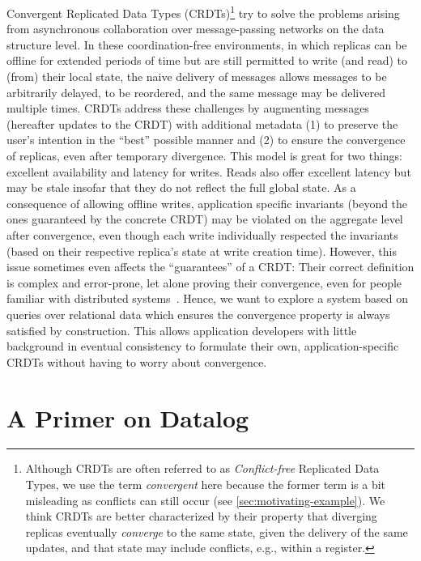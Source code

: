 \documentclass{article}
\begin{document}
Convergent Replicated Data Types (CRDTs)\footnote{
	Although CRDTs are often referred to as \emph{Conflict-free} Replicated
	Data Types, we use the term \emph{convergent} here because the former term
	is a bit misleading as conflicts can still occur
	(see \autoref{sec:motivating-example}).
	We think CRDTs are better characterized by their property that diverging
	replicas eventually \emph{converge} to the same state,
	given the delivery of the same updates,
	and that state may include conflicts, e.g., within a register.
} try to solve the problems arising from asynchronous collaboration over
message-passing networks on the data structure level.
In these coordination-free environments, in which replicas can be offline
for extended periods of time but are still permitted to write (and read)
to (from) their local state,
the naive delivery of messages allows messages to be arbitrarily delayed,
to be reordered, and the same message may be delivered multiple times.
CRDTs address these challenges by augmenting messages (hereafter updates
to the CRDT) with additional metadata (1) to preserve the user's intention
in the ``best'' possible manner and (2) to ensure the convergence of replicas,
even after temporary divergence.
This model is great for two things: excellent availability and latency for writes.
Reads also offer excellent latency but may be stale insofar that they do not
reflect the full global state.
As a consequence of allowing offline writes,
application specific invariants (beyond the ones guaranteed by the concrete CRDT)
may be violated on the aggregate level after convergence,
even though each write individually respected the invariants (based on their
respective replica's state at write creation time).
However, this issue sometimes even affects the ``guarantees'' of a CRDT:
Their correct definition is complex and error-prone,
let alone proving their convergence, even for people familiar with distributed
systems~\cite{kleppmann2022assessing, gomes2017verifying}.
Hence, we want to explore a system based on queries over relational data
which ensures the convergence property is always satisfied by construction.
This allows application developers with little background in eventual
consistency to formulate their own, application-specific CRDTs without
having to worry about convergence.

\section{A Primer on Datalog}
\label{sec:datalog-primer}
\end{document}
